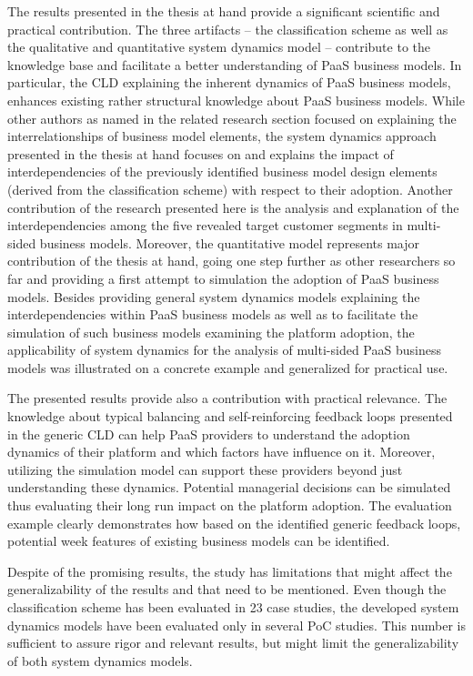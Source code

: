 The results presented in the thesis at hand provide a significant scientific and practical contribution. The three artifacts -- the classification scheme as well as the qualitative and quantitative system dynamics model -- contribute to the knowledge base and facilitate a better understanding of \ac{PaaS} business models. In particular, the \ac{CLD} explaining the inherent dynamics of \ac{PaaS} business models, enhances existing rather structural knowledge about \ac{PaaS} business models. While other authors as named in the related research section focused on explaining the interrelationships of business model elements, the system dynamics approach presented in the thesis at hand focuses on and explains the impact of interdependencies of the previously identified business model design elements (derived from the classification scheme) with respect to their adoption. Another contribution of the research presented here is the analysis and explanation of the interdependencies among the five revealed target customer segments in multi-sided business models. Moreover, the quantitative model represents major contribution of the thesis at hand, going one step further as other researchers so far and providing a first attempt to simulation the adoption of \ac{PaaS} business models. Besides providing general system dynamics models explaining the interdependencies within \ac{PaaS} business models as well as to facilitate the simulation of such business models examining the platform adoption, the applicability of system dynamics for the analysis of multi-sided \ac{PaaS} business models was illustrated on a concrete example and generalized for practical use.

The presented results provide also a contribution with practical relevance. The knowledge about typical balancing and self-reinforcing feedback loops presented in the generic \ac{CLD} can help \ac{PaaS} providers to understand the adoption dynamics of their platform and which factors have influence on it. Moreover, utilizing the simulation model can support these providers beyond just understanding these dynamics. Potential managerial decisions can be simulated thus evaluating their long run impact on the platform adoption. The evaluation example clearly demonstrates how based on the identified generic feedback loops, potential week features of existing business models can be identified.

Despite of the promising results, the study has limitations that might affect the generalizability of the results and that need to be mentioned. Even though the classification scheme has been evaluated in 23 case studies, the developed system dynamics models have been evaluated only in several \acf{PoC} studies. This number is sufficient to assure rigor and relevant results, but might limit the generalizability of both system dynamics models.

